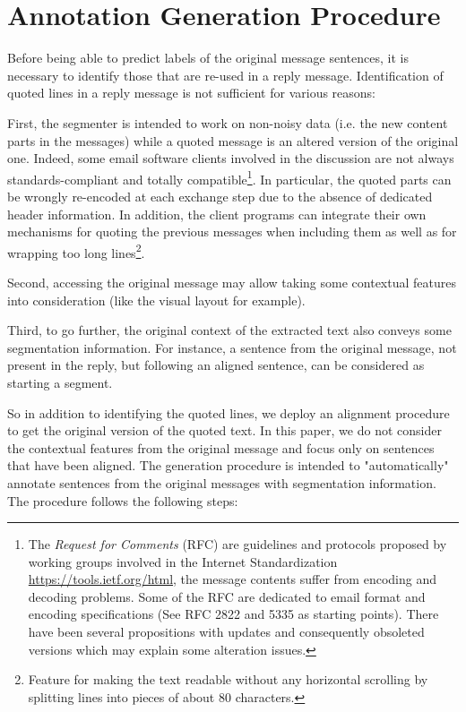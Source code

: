 \section{Annotation Generation Procedure}

Before being able to predict labels of the original message sentences, it is necessary to identify those that are re-used in a reply message. 
%
Identification of quoted lines in a reply message is not sufficient for various reasons:

First, the segmenter is intended to work on non-noisy data (i.e. the new content parts in the messages) while a quoted message is an altered version of the original one. 
% 
Indeed, some email software clients involved in the discussion are not always standards-compliant and totally compatible\footnote{The \textit{Request for Comments} (RFC) are guidelines and protocols proposed by working groups involved in the Internet Standardization \url{https://tools.ietf.org/html}, the message contents suffer from encoding and decoding problems. Some of the RFC are dedicated to email format and encoding specifications (See RFC 2822 and 5335 as starting points). There have been several propositions with updates and consequently obsoleted versions which may explain some alteration issues.}. 
%
In particular, the quoted parts can be wrongly re-encoded at each exchange step due to the absence of dedicated header information.
% 
In addition, the client programs can integrate their own mechanisms for quoting the previous messages when including them as well as for wrapping too long lines\footnote{Feature for making the text readable without any horizontal scrolling by splitting lines into pieces of about 80 characters.}.

Second, accessing the original message may allow taking some contextual features into consideration (like the visual layout for example). 

Third, to go further, the original context of the extracted text also conveys some segmentation information. For instance, a sentence from the original message, not present in the reply, but following an aligned sentence, can be considered as starting a segment.

So in addition to identifying the quoted lines, we deploy an alignment procedure to get the original version of the quoted text. 
In this paper, we do not consider the contextual features from the original message and focus only on sentences that have been aligned. 
% 
The generation procedure is intended to "automatically" annotate sentences from the original messages with segmentation information.
% 
The procedure follows the following steps:

